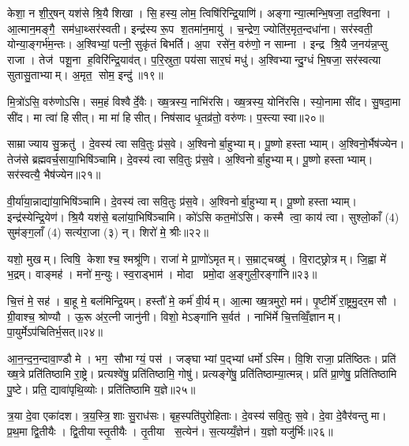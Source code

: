 केशा॒ न शी॒र्॒षन्‌ यश॑से श्रि॒यै शिखा। सि॒हस्य॒ लोम॒ त्विषि॑रिन्द्रि॒याणि॑। अङ्गान्या॒त्मन्भि॒षजा॒ तद॒श्विना। आ॒त्मान॒मङ्गै॒ सम॑धा॒थ्सर॑स्वती। इन्द्र॑स्य रू॒प श॒तमा॑न॒मायु॑। च॒न्द्रेण॒ ज्योति॑र॒मृत॒न्दधा॑ना। सर॑स्वती॒ योन्या॒ङ्गर्भ॑म॒न्तः। अ॒श्विभ्यां॒ पत्नी॒ सुकृ॑तं बिभर्ति। अ॒पा रसे॑न॒ वरु॑णो॒ न साम्ना। इन्द्र श्रि॒यै ज॒नय॑न्न॒प्सु राजा। तेज॑ पशू॒ना ह॒विरि॑न्द्रि॒याव॑त्। प॒रि॒स्रुता॒ पय॑सा सार॒घं मधु॑। अ॒श्विभ्यान्दु॒ग्धं भि॒षजा॒ सर॑स्वत्या सुतासु॒ताभ्याम्। अ॒मृत॒ सोम॒ इन्दु॑॥१९॥\anuvakamend[अन्त॑र आ॒राद॒न्तर्व॑साते व्याघ्रलो॒म राजा॑ च॒त्वारि॑ च]

मि॒त्रो॑ऽसि॒ वरु॑णोऽसि। सम॒हं विश्वैर्दे॒वैः। ख्ष॒त्रस्य॒ नाभि॑रसि। ख्ष॒त्रस्य॒ योनि॑रसि। स्यो॒नामा सी॑द। सु॒षदा॒मा सी॑द। मा त्वा॑ हिसीत्। मा मा॑ हिसीत्। निष॑साद धृ॒तव्र॑तो॒ वरु॑णः। प॒स्त्यास्वा॥२०॥

साम्राज्याय सु॒क्रतु॑। दे॒वस्य॑ त्वा सवि॒तुः प्र॑स॒वे। अ॒श्विनोर्बा॒हुभ्याम्। पू॒ष्णो हस्ताभ्याम्। अ॒श्विनो॒र्भैष॑ज्येन। तेज॑से ब्रह्मवर्च॒साया॒भिषि॑ञ्चामि। दे॒वस्य॑ त्वा सवि॒तुः प्र॑स॒वे। अ॒श्विनोर्बा॒हुभ्याम्। पू॒ष्णो हस्ताभ्याम्। सर॑स्वत्यै॒ भैष॑ज्येन॥२१॥

वी॒र्या॑या॒न्नाद्या॑या॒भिषि॑ञ्चामि। दे॒वस्य॑ त्वा सवि॒तुः प्र॑स॒वे। अ॒श्विनोर्बा॒हुभ्याम्। पू॒ष्णो हस्ताभ्याम्। इन्द्र॑स्येन्द्रि॒येण॑। श्रि॒यै यश॑से॒ बला॑या॒भिषि॑ञ्चामि। को॑ऽसि कत॒मो॑ऽसि। कस्मै त्वा॒ काय॑ त्वा। सुश्लो॒काँ (4) सुम॑ङ्ग॒लाँ (4) सत्य॑रा॒जा (३) न्। शिरो॑ मे॒ श्रीः॥२२॥

यशो॒ मुखम्। त्विषि॒ केशाश्च॒ श्मश्रू॑णि। राजा॑ मे प्रा॒णो॑ऽमृतम्। स॒म्राट्चख्षु॑। वि॒राट्छ्रोत्रम्। जि॒ह्वा मे॑ भ॒द्रम्। वाङ्मह॑। मनो॑ म॒न्युः। स्व॒राड्भाम॑। मोदा प्रमो॒दा अ॒ङ्गुली॒रङ्गा॑नि॥२३॥

चि॒त्तं मे॒ सह॑। बा॒हू मे॒ बल॑मिन्द्रि॒यम्। हस्तौ॑ मे॒ कर्म॑ वी॒र्यम्। आ॒त्मा ख्ष॒त्रमुरो॒ मम॑। पृ॒ष्टीर्मे॑ रा॒ष्ट्रमु॒दर॒मसौ। ग्री॒वाश्च॒ श्रोण्यौ। ऊ॒रू अ॑र॒त्नी जानु॑नी। विशो॒ मेऽङ्गा॑नि स॒र्वत॑। नाभि॑र्मे चि॒त्तव्विँ॒ज्ञानम्। पा॒युर्मेऽप॑चितिर्भ॒सत्॥२४॥

आ॒न॒न्द॒न॒न्दावा॒ण्डौ मे। भग॒ सौभाग्यं॒ पस॑। जङ्घाभ्यां प॒द्भ्यां धर्मोऽस्मि। वि॒शि राजा॒ प्रति॑ष्ठितः। प्रति॑ ख्ष॒त्रे प्रति॑तिष्ठामि रा॒ष्ट्रे। प्रत्यश्वे॑षु॒ प्रति॑तिष्ठामि॒ गोषु॑। प्रत्यङ्गे॑षु॒ प्रति॑तिष्ठाम्या॒त्मन्न्। प्रति॑ प्रा॒णेषु॒ प्रति॑तिष्ठामि पु॒ष्टे। प्रति॒ द्यावा॑पृथि॒व्योः। प्रति॑तिष्ठामि य॒ज्ञे॥२५॥

त्र॒या दे॒वा एका॑दश। त्र॒य॒स्त्रि॒शाः सु॒राध॑सः। बृह॒स्पति॑पुरोहिताः। दे॒वस्य॑ सवि॒तुः स॒वे। दे॒वा दे॒वैर॑वन्तु मा। प्र॒थ॒मा द्वि॒तीयैः। द्वि॒तीयास्तृ॒तीयैः। तृ॒तीया स॒त्येन॑। स॒त्यय्यँ॒ज्ञेन॑। य॒ज्ञो यजु॑र्भिः॥२६॥

